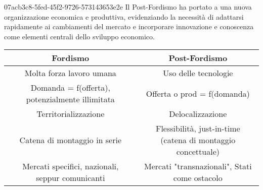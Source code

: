 \documentclass[preview]{standalone}
\begin{document}
\begin{snippet}{07acb3c8-5fed-45f2-9726-573143653e2e}
    Il Post-Fordismo ha portato a una nuova organizzazione economica e produttiva, evidenziando la necessità di adattarsi rapidamente ai cambiamenti del mercato e incorporare innovazione e conoscenza come elementi centrali dello sviluppo economico.

    \begin{table}[h]
        \centering
        \begin{tabular}{|c|c|}
        \hline
        \textbf{Fordismo} & \textbf{Post-Fordismo} \\ \hline
        Molta forza lavoro umana & Uso delle tecnologie \\ \hline
        Domanda = f(offerta), potenzialmente illimitata & Offerta o prod = f(domanda) \\ \hline
        Territorializzazione & Delocalizzazione \\\hline
        Catena di montaggio in serie & \makecell{Flessibilità, just-in-time\\ (catena di montaggio concettuale)} \\\hline
        \makecell{Mercati specifici, nazionali, \\seppur comunicanti} & Mercati "transnazionali", Stati come ostacolo \\ \hline
        \end{tabular}
    \end{table}
    \vspace{0.25cm}
\end{snippet}
\end{document}
